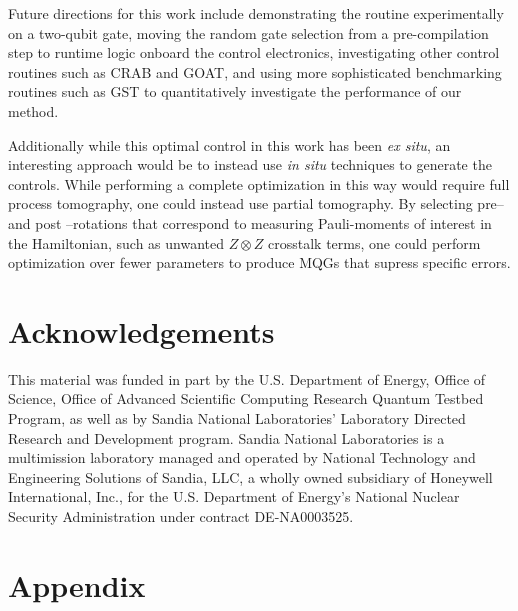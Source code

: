 \documentclass[aps,nofootinbib,pra,notitlepage,twocolumn]{revtex4-1}
\newcommand{\0}{\ensuremath{\mathbf{0}}}
\begin{document}
{Future directions for this work include demonstrating the routine experimentally on a two-qubit gate, moving the random gate selection from a pre-compilation step to runtime logic onboard the control electronics, investigating other control routines such as CRAB \cite{Caneva2011} and GOAT\cite{Machnes2018}, and using more sophisticated benchmarking routines such as GST\cite{BlumeKohout2017} to quantitatively investigate the performance of our method.

Additionally while this optimal control in this work has been \textit{ex situ}, an interesting approach would be to instead use \textit{in situ} techniques \cite{Wu2018, Kelly2014, Ferrie2015} to generate the controls. While performing a complete optimization in this way would require full process tomography, one could instead use partial tomography. By selecting pre-- and post --rotations that correspond to measuring Pauli-moments of interest in the Hamiltonian, such as unwanted $Z\otimes Z$ crosstalk terms, one could perform optimization over fewer parameters to produce MQGs that supress specific errors.


\section{Acknowledgements}
\label{sec:acknowledgements}
This material was funded in part by the U.S. Department of Energy, Office of Science, Office of Advanced Scientific Computing Research Quantum Testbed Program, as well as by Sandia National Laboratories' Laboratory Directed Research and Development program. Sandia National Laboratories is a multimission laboratory managed and operated by National Technology and Engineering Solutions of Sandia, LLC, a wholly owned subsidiary of Honeywell International, Inc., for the U.S. Department of Energy's National Nuclear Security Administration under contract DE-NA0003525.


\section{Appendix}
\label{sec:appendix}

}
\end{document}
